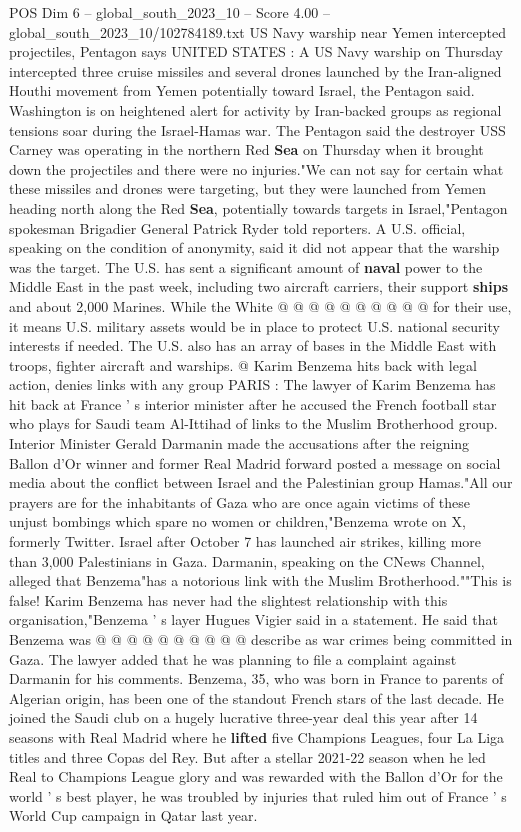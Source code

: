 \begin{textsample}{POS Dim 6 – global\_south\_2023\_10 – Score 4.00 – global\_south\_2023\_10/102784189.txt}  \label{ex:f6_pos_247}
US Navy warship near Yemen intercepted projectiles, Pentagon says UNITED STATES : A US Navy warship on Thursday intercepted three cruise missiles and several drones launched by the Iran-aligned Houthi movement from Yemen potentially toward Israel, the Pentagon said.
Washington is on heightened alert for activity by Iran-backed groups as regional tensions soar during the Israel-Hamas war.
The Pentagon said the destroyer USS Carney was operating in the northern Red \textbf{Sea} on Thursday when it brought down the projectiles and there were no injuries."We can not say for certain what these missiles and drones were targeting, but they were launched from Yemen heading north along the Red \textbf{Sea}, potentially towards targets in Israel,"Pentagon spokesman Brigadier General Patrick Ryder told reporters.
A U.S. official, speaking on the condition of anonymity, said it did not appear that the warship was the target.
The U.S. has sent a significant amount of \textbf{naval} power to the Middle East in the past week, including two aircraft carriers, their support \textbf{ships} and about 2,000 Marines.
While the White @ @ @ @ @ @ @ @ @ @ for their use, it means U.S. military assets would be in place to protect U.S. national security interests if needed.
The U.S. also has an array of bases in the Middle East with troops, fighter aircraft and warships. @ Karim Benzema hits back with legal action, denies links with any group PARIS : The lawyer of Karim Benzema has hit back at France ' s interior minister after he accused the French football star who plays for Saudi team Al-Ittihad of links to the Muslim Brotherhood group.
Interior Minister Gerald Darmanin made the accusations after the reigning Ballon d'Or winner and former Real Madrid forward posted a message on social media about the conflict between Israel and the Palestinian group Hamas."All our prayers are for the inhabitants of Gaza who are once again victims of these unjust bombings which spare no women or children,"Benzema wrote on X, formerly Twitter.
Israel after October 7 has launched air strikes, killing more than 3,000 Palestinians in Gaza.
Darmanin, speaking on the CNews Channel, alleged that Benzema"has a notorious link with the Muslim Brotherhood.""This is false!
Karim Benzema has never had the slightest relationship with this organisation,"Benzema ' s layer Hugues Vigier said in a statement.
He said that Benzema was @ @ @ @ @ @ @ @ @ @ describe as war crimes being committed in Gaza.
The lawyer added that he was planning to file a complaint against Darmanin for his comments.
Benzema, 35, who was born in France to parents of Algerian origin, has been one of the standout French stars of the last decade.
He joined the Saudi club on a hugely lucrative three-year deal this year after 14 seasons with Real Madrid where he \textbf{lifted} five Champions Leagues, four La Liga titles and three Copas del Rey.
But after a stellar 2021-22 season when he led Real to Champions League glory and was rewarded with the Ballon d'Or for the world ' s best player, he was troubled by injuries that ruled him out of France ' s World Cup campaign in Qatar last year.

\end{textsample}
